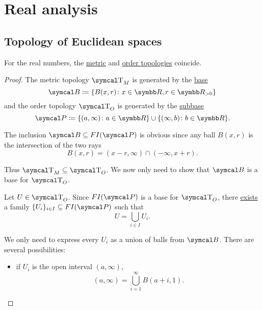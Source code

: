 \section{Real analysis}\label{sec:real_analysis}
\subsection{Topology of Euclidean spaces}\label{subsec:real_vector_space_geometry}

\begin{theorem}\label{thm:real_metric_and_order_topologies_coincide}
  For the real numbers, the \hyperref[def:metric_topology]{metric} and \hyperref[def:order_topology]{order topologies} coincide.
\end{theorem}
\begin{proof}
  The metric topology \( \CT_M \) is generated by the \hyperref[def:topological_base]{base}
  \begin{equation*}
    \Cal{B} \coloneqq \{ B(x, r) \colon x \in \BR, r \in \BR_{>0} \}
  \end{equation*}
  and the order topology \( \CT_O \) is generated by the \hyperref[def:topological_subbase]{subbase}
  \begin{equation*}
    \Cal{P} \coloneqq \{ (a, \infty) \colon a \in \BR \} \cup \{ (\infty, b) \colon b \in \BR \}.
  \end{equation*}

  The inclusion \( \Cal{B} \subseteq FI(\Cal{P}) \) is obvious since any ball \( B(x, r) \) is the intersection of the two rays
  \begin{equation*}
    B(x, r) = (x - r, \infty) \cap (-\infty, x + r).
  \end{equation*}

  Thus \( \CT_M \subseteq \CT_O \). We now only need to show that \( \Cal{B} \) is a base for \( \CT_O \).

  Let \( U \in \CT_O \). Since \( FI(\Cal{P}) \) is a base for \( \CT_O \), there \hyperref[def:topological_base/union]{exists} a family \( \{ U_i \}_{i \in I} \subseteq FI(\Cal{P}) \) such that
  \begin{equation*}
    U = \bigcup_{i \in I} U_i.
  \end{equation*}

  We only need to express every \( U_i \) as a union of balls from \( \Cal{B} \). There are several possibilities:
  \begin{itemize}
    \item if \( U_i \) is the open interval \( (a, \infty) \),
          \begin{equation*}
            (a, \infty) = \bigcup_{i=1}^\infty B(a + i, 1).
          \end{equation*}


\end{itemize}
\end{proof}
